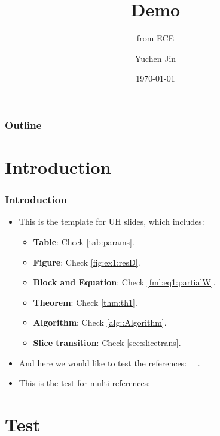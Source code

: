\documentclass[xcolor={usenames,dvipsnames},aspectratio=169]{beamer}
\title{Demo}
\author{Yuchen Jin}
\subtitle{from ECE}
\institute{}
\date[\MONTH~\the\day] %
{\today}
\begin{document}
\titleframe

\begin{frame}
  \frametitle{Outline}
  \tableofcontents[currentsection]
\end{frame}

\section{Introduction}
\begin{frame}
\frametitle{Introduction}
  \begin{itemize}
    \item This is the template for UH slides, which includes:
    \begin{itemize}
      \item \textbf{Table}: Check \cref{tab:params}.
      \item \textbf{Figure}: Check \cref{fig:ex1:resD}.
      \item \textbf{Block and Equation}: Check \eqref{fml:eq1:partialW}.
      \item \textbf{Theorem}: Check \cref{thm:th1}.
      \item \textbf{Algorithm}: Check \cref{alg::Algorithm}.
      \item \textbf{Slice transition}: Check \cref{sec:slicetrans}.
    \end{itemize}
    \item And here we would like to test the references: \cite{Zeiler5539957}~\cite{Yang6175956}~\cite{Dong7115171}.
    \item This is the test for multi-references: \cite{Zeiler5539957, Yang6175956, Dong7115171}
  \end{itemize}
\end{frame}

\section{Test}
\end{document}
